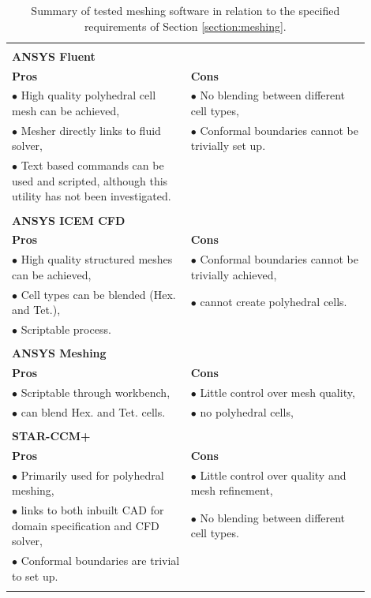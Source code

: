 \documentclass[12pt,oneside,a4paper]{article}
\begin{document}
\begin{table}[!t]
\centering
\caption{Summary of tested meshing software in relation to the specified requirements of Section \ref{section:meshing}.}
\label{table:meshSoftwareComparisons}
\begin{tabular}{p{0.45\linewidth}p{0.45\linewidth}}
&\\
\textbf{ANSYS Fluent}	&	\\
\hline
\textbf{Pros}	&	\textbf{Cons}	\\
$\bullet$ High quality polyhedral cell mesh can be achieved,
&
$\bullet$ No blending between different cell types,
\\

$\bullet$ Mesher directly links to fluid solver,
&
$\bullet$ Conformal boundaries cannot be trivially set up.
\\

$\bullet$ Text based commands can be used and scripted, although this utility has not been investigated.
&
\\&\\	

\textbf{ANSYS ICEM CFD}	&	\\
\hline
\textbf{Pros}	&	\textbf{Cons}	\\
$\bullet$	High quality structured meshes can be achieved,
&
$\bullet$	Conformal boundaries cannot be trivially achieved,
\\
$\bullet$	Cell types can be blended (Hex. and Tet.),
&
$\bullet$	cannot create polyhedral cells.
\\
$\bullet$	Scriptable process.
&
\\&\\

\textbf{ANSYS Meshing}	&	\\
\hline
\textbf{Pros}	&	\textbf{Cons}	\\
$\bullet$ 	Scriptable through workbench,
&
$\bullet$	Little control over mesh quality,
\\
$\bullet$	can blend Hex. and Tet. cells.
&
$\bullet$	no polyhedral cells,
\\&\\

\textbf{STAR-CCM+}	&	\\
\hline
\textbf{Pros}	&	\textbf{Cons}	\\
$\bullet$ 	Primarily used for polyhedral meshing,
&
$\bullet$	Little control over quality and mesh refinement,
\\
$\bullet$	links to both inbuilt CAD for domain specification and CFD solver,
&
$\bullet$	No blending between different cell types.
\\
$\bullet$	Conformal boundaries are trivial to set up.
&
\\&\\


\end{tabular}
\end{table}
\end{document}
